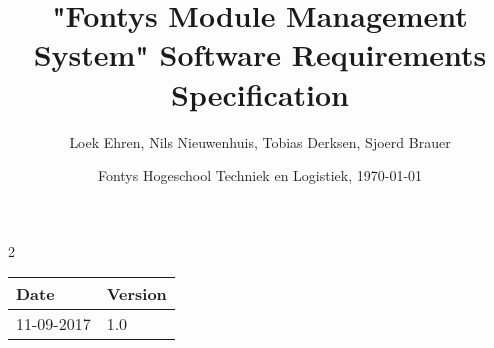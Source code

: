 \documentclass{report}
\begin{document}
	
	\author{Loek Ehren, Nils Nieuwenhuis, Tobias Derksen, Sjoerd Brauer}
	\title{"Fontys Module Management System" Software Requirements Specification}
	\date{Fontys Hogeschool Techniek en Logistiek, \today}
	
	\maketitle
	
	\thispagestyle{empty}
	
	\newpage
	
	\setcounter{page}2
	
	\begin{table}[htbp]
		\centering
		\begin{tabularx}{\textwidth}{X X}
			\textbf{Date}     & \textbf{Version}   		\\ \hline 										\hline
			11-09-2017         & 1.0             		\\ \hline
		\end{tabularx}
	\end{table}
	
	\tableofcontents
	\listoffigures
	\listoftables
	\printglossary[type=\acronymtype,title=List of Abbreviations]

	
	\lhead{\nouppercase{\leftmark}}
	
	
	
	
	
	
	
\end{document}
